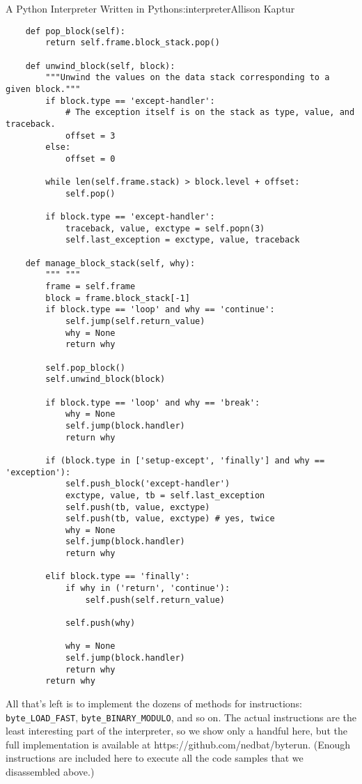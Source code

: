 \begin{aosachapter}{A Python Interpreter Written in Python}{s:interpreter}{Allison Kaptur}
\begin{verbatim}
    def pop_block(self):
        return self.frame.block_stack.pop()

    def unwind_block(self, block):
        """Unwind the values on the data stack corresponding to a given block."""
        if block.type == 'except-handler':
            # The exception itself is on the stack as type, value, and traceback.
            offset = 3  
        else:
            offset = 0

        while len(self.frame.stack) > block.level + offset:
            self.pop()

        if block.type == 'except-handler':
            traceback, value, exctype = self.popn(3)
            self.last_exception = exctype, value, traceback

    def manage_block_stack(self, why):
        """ """
        frame = self.frame
        block = frame.block_stack[-1]
        if block.type == 'loop' and why == 'continue':
            self.jump(self.return_value)
            why = None
            return why

        self.pop_block()
        self.unwind_block(block)

        if block.type == 'loop' and why == 'break':
            why = None
            self.jump(block.handler)
            return why

        if (block.type in ['setup-except', 'finally'] and why == 'exception'):
            self.push_block('except-handler')
            exctype, value, tb = self.last_exception
            self.push(tb, value, exctype)
            self.push(tb, value, exctype) # yes, twice
            why = None
            self.jump(block.handler)
            return why

        elif block.type == 'finally':
            if why in ('return', 'continue'):
                self.push(self.return_value)

            self.push(why)

            why = None
            self.jump(block.handler)
            return why
        return why
\end{verbatim}

\label{the-instructions}

All that's left is to implement the dozens of methods for instructions:
\texttt{byte\_LOAD\_FAST}, \texttt{byte\_BINARY\_MODULO}, and so on. The
actual instructions are the least interesting part of the interpreter,
so we show only a handful here, but the full implementation is available
at https://github.com/nedbat/byterun. (Enough instructions are included
here to execute all the code samples that we disassembled above.)


\end{aosachapter}
